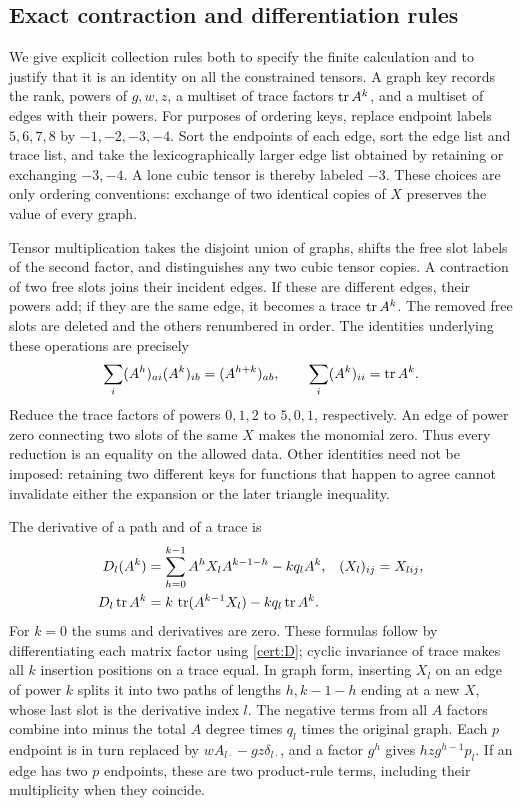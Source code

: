 \subsection{Exact contraction and differentiation rules}\label{cert:collection}

We give explicit collection rules both to specify the finite calculation and
to justify that it is an identity on all the constrained tensors.  A graph
key records the rank, powers of $g,w,z$, a multiset of trace factors
$\operatorname{tr} A^k$, and a multiset of edges with their powers.  For purposes of
ordering keys, replace endpoint labels $5,6,7,8$ by $-1,-2,-3,-4$.
Sort the endpoints of each edge, sort the edge list and trace list, and take
the lexicographically larger edge list obtained by retaining or exchanging
$-3,-4$.  A lone cubic tensor is thereby labeled $-3$.  These choices are
only ordering conventions: exchange of two identical copies of $X$ preserves
the value of every graph.

Tensor multiplication takes the disjoint union of graphs, shifts the free
slot labels of the second factor, and distinguishes any two cubic tensor
copies.  A contraction of two free slots joins their incident edges.  If
these are different edges, their powers add; if they are the same edge, it
becomes a trace $\operatorname{tr} A^k$.  The removed free slots are deleted and the others
renumbered in order.  The identities underlying these operations are precisely
\[
 \sum_i(A^h)_{ai}(A^k)_{ib}=(A^{h+k})_{ab},\qquad
 \sum_i(A^k)_{ii}=\operatorname{tr} A^k.
\]
Reduce the trace factors of powers $0,1,2$ to $5,0,1$, respectively.  An
edge of power zero connecting two slots of the same $X$ makes the monomial
zero.  Thus every reduction is an equality on the allowed data.  Other
identities need not be imposed: retaining two different keys for functions
that happen to agree cannot invalidate either the expansion or the later
triangle inequality.

The derivative of a path and of a trace is
\begin{align}
 D_l(A^k)&=\sum_{h=0}^{k-1}A^hX_lA^{k-1-h}-kq_lA^k,
       & (X_l)_{ij}&=X_{lij},\label{cert:path-derivative}\\
 D_l\operatorname{tr} A^k&=k\,\operatorname{tr}(A^{k-1}X_l)-kq_l\operatorname{tr} A^k.
       \label{cert:trace-derivative}
\end{align}
For $k=0$ the sums and derivatives are zero.  These formulas follow by
differentiating each matrix factor using \eqref{cert:D}; cyclic invariance
of trace makes all $k$ insertion positions on a trace equal.  In graph form,
inserting $X_l$ on an edge of power $k$ splits it into two paths of lengths
$h,k-1-h$ ending at a new $X$, whose last slot is the derivative index $l$.
The negative terms from all $A$ factors combine into minus the total
$A$ degree times $q_l$ times the original graph.  Each $p$ endpoint is in
turn replaced by $wA_{l\cdot}-gz\delta_{l\cdot}$, and a factor $g^h$ gives
$hzg^{h-1}p_l$.  If an edge has two $p$ endpoints, these are two product-rule
terms, including their multiplicity when they coincide.

